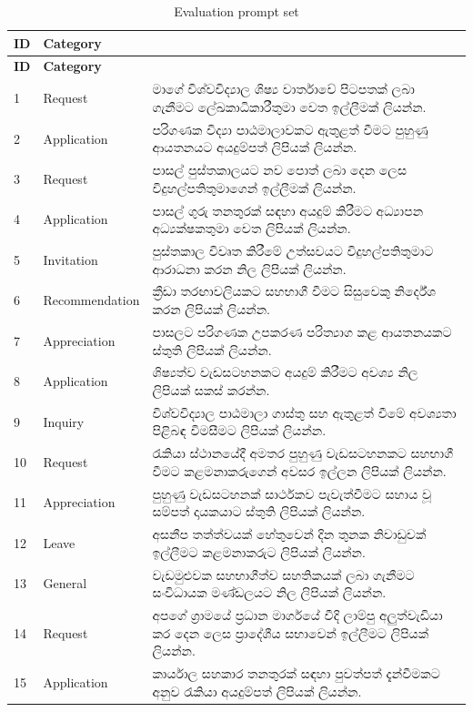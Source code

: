 \documentclass[12pt]{uomthesis}
\begin{document}
\begin{appendices}
\begin{longtable}{@{}p{1.2cm}p{2.6cm}>{\sinhalafont\raggedright\arraybackslash}p{10.8cm}@{}}
\caption{Evaluation prompt set}
\label{tab:appendix_evaluation_prompts}\\
\toprule
\textbf{ID} & \textbf{Category} & \multicolumn{1}{p{10.8cm}}{\textbf{Prompt}} \\
\midrule
\endfirsthead
\toprule
\textbf{ID} & \textbf{Category} & \multicolumn{1}{p{10.8cm}}{\textbf{Prompt}} \\
\midrule
\endhead
1 & Request & මාගේ විශ්වවිද්‍යාල ශිෂ්‍ය වාර්තාවේ පිටපතක් ලබා ගැනීමට ලේඛකාධිකාරීතුමා වෙත ඉල්ලීමක් ලියන්න. \\
2 & Application & පරිගණක විද්‍යා පාඨමාලාවකට ඇතුළත් වීමට පුහුණු ආයතනයට අයදුම්පත් ලිපියක් ලියන්න. \\
3 & Request & පාසල් පුස්තකාලයට නව පොත් ලබා දෙන ලෙස විදුහල්පතිතුමාගෙන් ඉල්ලීමක් ලියන්න. \\
4 & Application & පාසල් ගුරු තනතුරක් සඳහා අයදුම් කිරීමට අධ්‍යාපන අධ්‍යක්ෂකතුමා වෙත ලිපියක් ලියන්න. \\
5 & Invitation & පුස්තකාල විවෘත කිරීමේ උත්සවයට විදුහල්පතිතුමාට ආරාධනා කරන නිල ලිපියක් ලියන්න. \\
6 & Recommendation & ක්‍රීඩා තරඟාවලියකට සහභාගී වීමට සිසුවෙකු නිර්දේශ කරන ලිපියක් ලියන්න. \\
7 & Appreciation & පාසලට පරිගණක උපකරණ පරිත්‍යාග කළ ආයතනයකට ස්තුති ලිපියක් ලියන්න. \\
8 & Application & ශිෂ්‍යත්ව වැඩසටහනකට අයදුම් කිරීමට අවශ්‍ය නිල ලිපියක් සකස් කරන්න. \\
9 & Inquiry & විශ්වවිද්‍යාල පාඨමාලා ගාස්තු සහ ඇතුළත් වීමේ අවශ්‍යතා පිළිබඳ විමසීමට ලිපියක් ලියන්න. \\
10 & Request & රැකියා ස්ථානයේදී අමතර පුහුණු වැඩසටහනකට සහභාගී වීමට කළමනාකරුගෙන් අවසර ඉල්ලන ලිපියක් ලියන්න. \\
11 & Appreciation & පුහුණු වැඩසටහනක් සාර්ථකව පැවැත්වීමට සහාය වූ සම්පත් දායකයාට ස්තුති ලිපියක් ලියන්න. \\
12 & Leave & අසනීප තත්ත්වයක් හේතුවෙන් දින තුනක නිවාඩුවක් ඉල්ලීමට කළමනාකරුට ලිපියක් ලියන්න. \\
13 & General & වැඩමුළුවක සහභාගීත්ව සහතිකයක් ලබා ගැනීමට සංවිධායක මණ්ඩලයට නිල ලිපියක් ලියන්න. \\
14 & Request & අපගේ ග්‍රාමයේ ප්‍රධාන මාර්ගයේ වීදි ලාම්පු අලුත්වැඩියා කර දෙන ලෙස ප්‍රාදේශීය සභාවෙන් ඉල්ලීමට ලිපියක් ලියන්න. \\
15 & Application & කාර්යාල සහකාර තනතුරක් සඳහා පුවත්පත් දැන්වීමකට අනුව රැකියා අයදුම්පත් ලිපියක් ලියන්න. \\

\end{longtable}
\end{appendices}
\end{document}
